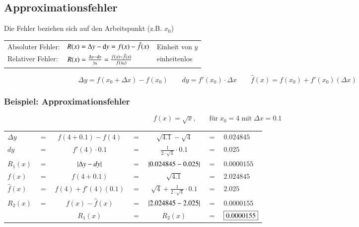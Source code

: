 \subsection{Approximationsfehler}

Die Fehler beziehen sich auf den Arbeitspunkt (z.B. $x_0$)

\renewcommand{\arraystretch}{2}
    \begin{tabular}{lll}
    Absoluter Fehler:   & $R(x) = \Delta y - \mathop{} \! \mathrm{d} y = f(x) - \hat f(x)$                             & Einheit von $y$ \\
    Relativer Fehler:   & $R(x) = \frac{\Delta y - \mathop{} \! \mathrm{d} y}{y_0} = \frac{f(x) - \hat f(x)}{f(x_0)}$  & einheitenlos
\end{tabular}
\[
    \Delta y = f(x_0 + \Delta x)- f(x_0) \quad \quad dy = f'(x_0)\cdot \Delta x \quad \quad \hat f(x) = f(x_0)+ f'(x_0)(\Delta x)  
\]
\renewcommand{\arraystretch}{1.5}

\subsubsection*{Beispiel:  Approximationsfehler}
\[
    f(x) = \sqrt{x}\text{,} \quad\quad  \text{für} \;x_0 = 4 \;\text{mit}\; \Delta x = 0.1
\]
\begin{tabular}{llclcll}
    \\
    $ \Delta y$ &$=$& $f(4+0.1)-f(4)$ &$=$& $\sqrt{4.1} - \sqrt{4}$ &$=$& $0.024845$\\
    $ dy$ &$=$& $f'(4) \cdot 0.1$ &$=$& $\frac{1}{2\cdot \sqrt{4}} \cdot 0.1$ &$=$& $0.025 $ \\
    $ R_1(x)$ &$=$& $\left|\Delta y - dy\right|$ &$=$& $\left|0.024845 - 0.025\right|$ &$=$& $0.0000155$\\
    $ f(x)$ &$=$& $f(4+0.1)$ &$=$& $\sqrt{4.1}$ &$=$& $2.024845$\\
    $ \hat f(x)$ &$=$& $f(4)+ f'(4)(0.1)$ &$=$& $\sqrt{4} + \frac{1}{2\cdot \sqrt{4}} \cdot 0.1$ &$=$& $2.025 $ \\
    $ R_2(x)$ &$=$& $f(x)-\hat f(x)$ &$=$& $\left|2.024845 - 2.025\right|$ &$=$& $0.0000155$\\
    \hline
              &   & $ R_1(x)$ &$=$& $ R_2(x)$ &$=$& $\fbox{0.0000155}$
\end{tabular}

